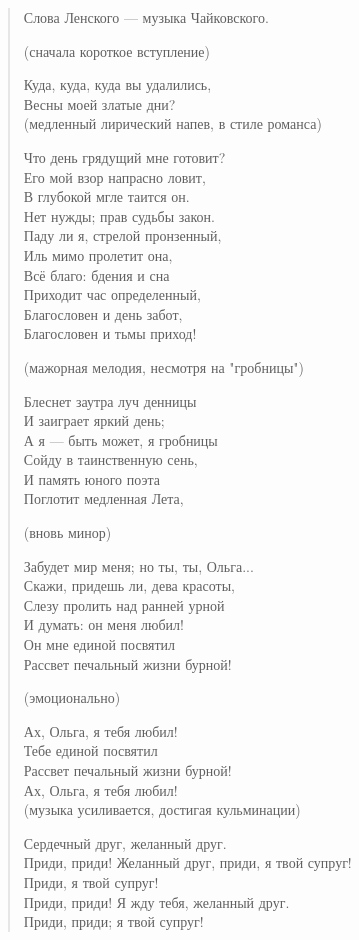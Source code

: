 \begin{verse}
Слова Ленского — музыка Чайковского.

(сначала короткое вступление)

Куда, куда, куда вы удалились,\\
Весны моей златые дни?\\

(медленный лирический напев, в стиле романса)

Что день грядущий мне готовит?\\
Его мой взор напрасно ловит,\\
В глубокой мгле таится он.\\
Нет нужды; прав судьбы закон.\\
Паду ли я, стрелой пронзенный,\\
Иль мимо пролетит она,\\
Всё благо: бдения и сна\\
Приходит час определенный,\\
Благословен и день забот,\\
Благословен и тьмы приход!

(мажорная мелодия, несмотря на "гробницы")

Блеснет заутра луч денницы\\
И заиграет яркий день;\\
А я — быть может, я гробницы\\
Сойду в таинственную сень,\\
И память юного поэта\\
Поглотит медленная Лета,

(вновь минор)

Забудет мир меня; но ты, ты, Ольга...\\
Скажи, придешь ли, дева красоты,\\
Слезу пролить над ранней урной\\
И думать: он меня любил!\\
Он мне единой посвятил\\
Рассвет печальный жизни бурной!

(эмоционально)

Ах, Ольга, я тебя любил!\\		
Тебе единой посвятил\\
Рассвет печальный жизни бурной!\\
Ах, Ольга, я тебя любил!\\

(музыка усиливается, достигая кульминации)

Сердечный друг, желанный друг.\\
Приди, приди! Желанный друг, приди, я твой супруг!\\
Приди, я твой супруг!\\
Приди, приди! Я жду тебя, желанный друг.\\
Приди, приди; я твой супруг!\\


\end{verse}
